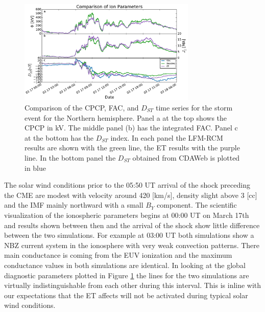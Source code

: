 \documentclass[draft,jgrga]{agutex}
\begin{document}
\begin{article}
\begin{figure}
\noindent\includegraphics[width=20pc]{JGRPaper-IonFig.pdf}
\caption{\label{ion-comp-fig} 
Comparison of the CPCP, FAC, and $D_{ST}$ time series for the storm event for the Northern hemisphere.  Panel a at the top shows the CPCP in kV.  The middle panel (b) has the integrated  FAC.  Panel c at the bottom has the $D_{ST}$ index.  In each panel the LFM-RCM results are shown with the green line, the ET results with the purple line.  In the bottom panel the $D_{ST}$ obtained from CDAWeb is plotted in blue} 
\end{figure}

The solar wind conditions prior to the 05:50 UT arrival of the shock preceding the CME are modest with velocity around 420 [km/s], density slight above 3 [cc] and the IMF mainly northward with a small $B_Y$ component.  The scientific visualization of the ionospheric parameters begins at 00:00 UT on March 17th and results shown between then and the arrival of the shock show little difference between the two simulations.   For example at 03:00 UT both simulations show a NBZ current system in the ionosphere with very weak convection patterns.  There main conductance is coming from the EUV ionization and the maximum conductance values in both simulations are identical.   In looking at the global diagnostic parameters plotted in Figure \ref{ion-comp-fig} the lines for the two simulations are virtually indistinguishable from each other during this interval.   This is inline with our expectations that the ET affects will not be activated during typical solar wind conditions. 


\end{article}
\end{document}
